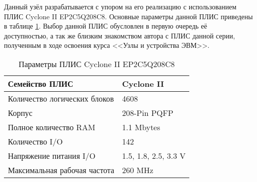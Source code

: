 Данный узёл разрабатывается с упором на его реализацию с использованием ПЛИС Cyclone II EP2C5Q208C8. Основные параметры данной ПЛИС приведены в таблице \ref{table:fpga}. Выбор данной ПЛИС обусловлен в первую очередь её доступностью, а так же близким знакомством автора с ПЛИС данной серии, полученным в ходе освоения курса <<Узлы и устройства ЭВМ>>.

\begin{table}[h]
  \centering
  \begin{tabular}{|l|l|}
    \hline
    Семейство ПЛИС & Cyclone II \\ \hline
    Количество логических блоков &  4608 \\ \hline
    Корпус & 208-Pin PQFP \\ \hline
    Полное количество RAM & 1.1 Mbytes \\ \hline
    Количество I/O & 142 \\ \hline
    Напряжение питания I/O  & 1.5, 1.8, 2.5, 3.3 V \\ \hline
    Максимальная рабочая частота & 260 MHz \\ \hline
  \end{tabular}
  \caption{Параметры ПЛИС Cyclone II EP2C5Q208C8}
  \label{table:fpga}
\end{table}